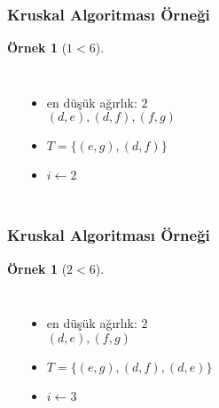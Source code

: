 \documentclass[dvipsnames]{beamer}
\theoremstyle{definition}
\theoremstyle{example}
\newtheorem{ornek}[theorem]{Örnek}
\theoremstyle{plain}
\begin{document}
\begin{frame}
  \frametitle{Kruskal Algoritması Örneği}

  \begin{ornek}[$1 < 6$]
    \begin{columns}
      \begin{center}
      \end{center}

      \pause
      \begin{itemize}
        \item en düşük ağırlık: $2$\\
          $(d,e), (d,f), (f,g)$

        \pause
        \item $T = \{ (e,g), (d,f) \}$
        \item $i \leftarrow 2$
      \end{itemize}
    \end{columns}
  \end{ornek}
\end{frame}

\begin{frame}
  \frametitle{Kruskal Algoritması Örneği}

  \begin{ornek}[$2 < 6$]
    \begin{columns}
      \begin{center}
      \end{center}

      \pause
      \begin{itemize}
        \item en düşük ağırlık: $2$\\
          $(d,e), (f,g)$

        \pause
        \item $T = \{ (e,g), (d,f), (d,e) \}$
        \item $i \leftarrow 3$
      \end{itemize}
    \end{columns}
  \end{ornek}
\end{frame}
\end{document}
